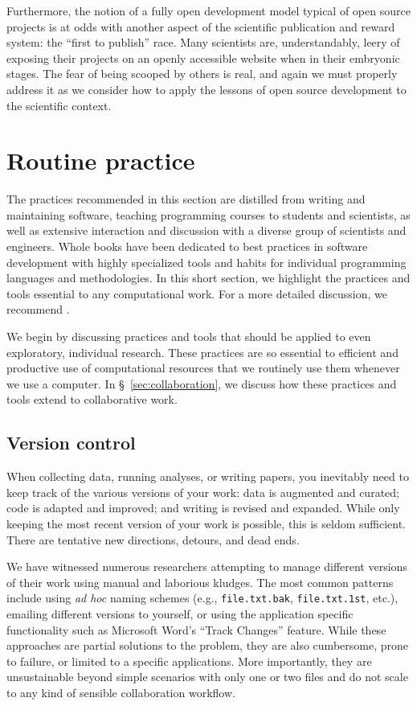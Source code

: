 \documentclass[11pt,oneside,english]{article}
\begin{document}
Furthermore, the notion of a fully open development model typical of open
source projects is at odds with another aspect of the scientific publication
and reward system: the ``first to publish'' race. Many scientists are,
understandably, leery of exposing their projects on an openly accessible
website when in their embryonic stages. The fear of being scooped by others is
real, and again we must properly address it as we consider how to apply the
lessons of open source development to the scientific context.

\section{\label{sec:practice}Routine practice}

The practices recommended in this section are distilled from writing and
maintaining software, teaching programming courses to students and scientists,
as well as extensive interaction and discussion with a diverse group of
scientists and engineers.  Whole books have been dedicated to best practices in
software development with highly specialized tools and habits for individual
programming languages and methodologies.  In this short section, we highlight
the practices and tools essential to any computational work. For a more
detailed discussion, we recommend
\cite{kernighan1999practice,HT00,2012arXiv1210.0530A}.

We begin by discussing practices and tools that should be applied to even
exploratory, individual research.  These practices are so essential to
efficient and productive use of computational resources that we routinely use
them whenever we use a computer. In §~\ref{sec:collaboration}, we discuss how these
practices and tools extend to collaborative work. 

\subsection{Version control}\label{subsec:vc}

When collecting data, running analyses, or writing papers, you inevitably need
to keep track of the various versions of your work: data is augmented and
curated; code is adapted and improved; and writing is revised and expanded.
While only keeping the most recent version of your work is possible,
this is seldom sufficient.  There are tentative new directions,
detours, and dead ends.

We have witnessed numerous researchers attempting to manage different versions
of their work using manual and laborious kludges. The most common patterns
include using \emph{ad hoc} naming schemes (e.g., \texttt{file.txt.bak},
\texttt{file.txt.1st}, etc.), emailing different versions to yourself, or using
the application specific functionality such as Microsoft Word's ``Track
Changes'' feature.  While these approaches are partial solutions to the
problem, they are also cumbersome, prone to failure, or limited to a specific
applications.  More importantly, they are unsustainable beyond simple
scenarios with only one or two files and do not scale to any kind of sensible
collaboration workflow.
\end{document}
